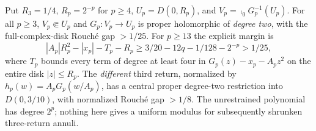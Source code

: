 \begin{theorem}\label{thm:rouche}
Put $R_3=1/4$, $R_p=2^{-p}$ for $p\ge4$,
$U_p=D(0,R_p)$, and $V_p=\comp_0 G_p^{-1}(U_p)$.
For all $p\ge3$, $V_p\Subset U_p$ and
$G_p:V_p\to U_p$ is proper holomorphic of \emph{degree two},
with the full-complex-disk Rouch\'e gap $>1/25$.
For $p\ge13$ the explicit margin is
\begin{equation}\label{eq:p-margin}
 |A_p|R_p^2-|x_p|-T_p-R_p
 \ge 3/20-12q-1/128-2^{-p}>1/25,
\end{equation}
where $T_p$ bounds every term of degree at least four
in $G_p(z)-x_p-A_pz^2$ on the entire disk $|z|\le R_p$.
The \emph{different} third return, normalized by
$h_p(w)=A_pG_p(w/A_p)$, has a central proper
degree-two restriction into $D(0,3/10)$, with
normalized Rouch\'e gap $>1/8$.
The unrestrained polynomial has degree $2^p$; nothing
here gives a uniform modulus for subsequently shrunken
three-return annuli.
\end{theorem}



